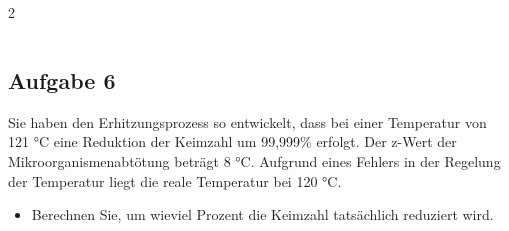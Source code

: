\documentclass[a4paper,10pt]{article}
\newif\ifshowme
\begin{document}
\begin{multicols}{2}
\begin{center}
\begin{tabular}{r|r}
\end{tabular}\end{center}

\ifshowme
\antwort{
\begin{align*}
F_{0}  &= &F_t \cdot 10^{\frac{T_2-T_1}{z}} \qquad && \\ \\
F_{01} &= &10 ~\text{s} \cdot 10^{\frac{95-121,1}{10}}  \qquad &= 0,025 ~\text{s} \\
F_{02} &= &15 ~\text{s} \cdot 10^{\frac{110-121,1}{10}} \qquad &= 1,16 ~\text{s} \\
F_{03} &= &42 ~\text{s} \cdot 10^{\frac{130-121,1}{10}} \qquad &= 326,02 ~\text{s} \\
F_{04} &= &35 ~\text{s} \cdot 10^{\frac{120-121,1}{10}} \qquad &= 27,17 ~\text{s} \\
F_{05} &= &10 ~\text{s} \cdot 10^{\frac{90-121,1}{10}}  \qquad &= 0,008 ~\text{s} \\
\end{align*}

Summe aller Zeiten:
\begin{align*}
\sum_{i=1}^{5} F_{0i} = 5,91 ~\text{min}
\end{align*}
}
\else
\ppbig \vspace*{3cm}
\fi

\ifshowme
\columnbreak
\else
\fi 

\subsection*{Aufgabe 6}
Sie haben den Erhitzungsprozess so entwickelt, dass bei einer Temperatur von 121 °C eine
Reduktion der Keimzahl um 99,999\% erfolgt. Der z-Wert der Mikroorganismenabtötung
beträgt 8 °C. Aufgrund eines Fehlers in der Regelung der Temperatur liegt die reale
Temperatur bei 120 °C. 
\begin{itemize}

\item Berechnen Sie, um wieviel Prozent die Keimzahl tatsächlich reduziert
wird.
\ifshowme
\antwort{

\begin{align*}
D_1 &= D_2 \cdot 10^{\frac{T_1-T_2}{z}} \\
D_1 &= 5 D \cdot 10^{\frac{120-121}{8}} \\
D_1 &= 3,75 \\
\\
1 - 1 \cdot 10^{-3,75} &= 0,99982
\end{align*}
}
\else
\ppbig \vspace*{1cm}
\fi


\end{itemize}
\end{multicols}
\end{document}
